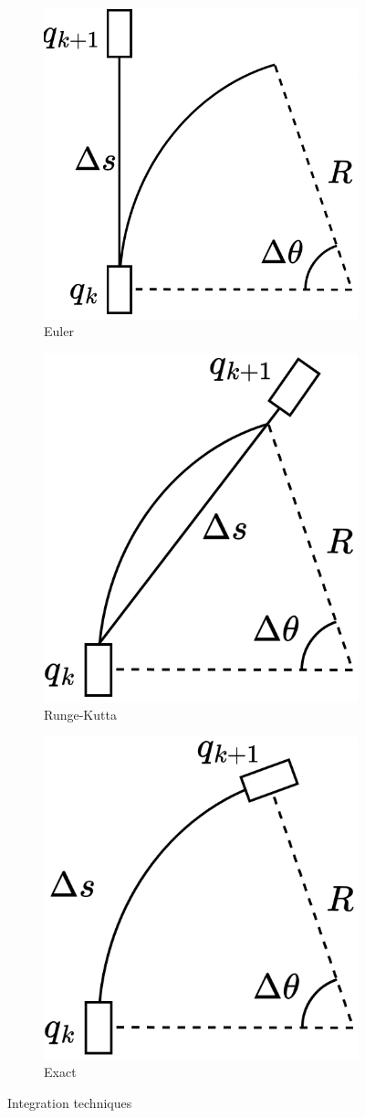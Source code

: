 \begin{figure}[H]
    \centering
    \begin{subfigure}{0.32\textwidth}
        \centering
        \includegraphics[width=0.6\linewidth]{images/euler.png} 
        \caption{Euler}
    \end{subfigure}
    \begin{subfigure}{0.32\textwidth}
        \centering
        \includegraphics[width=0.6\linewidth]{images/rk.png}
        \caption{Runge-Kutta}
    \end{subfigure}
    \begin{subfigure}{0.32\textwidth}
        \centering
        \includegraphics[width=0.6\linewidth]{images/exact.png}
        \caption{Exact}
    \end{subfigure}
    \caption{Integration techniques}
\end{figure}
